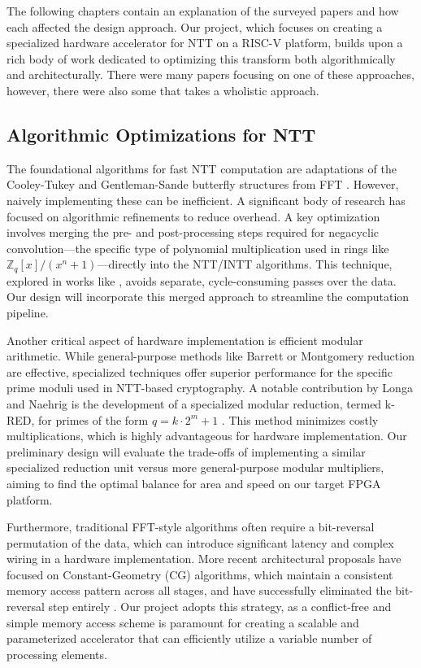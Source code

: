 \documentclass[a4paper, 12pt, titlepage]{article}
\begin{document}
The following chapters contain an explanation of the surveyed papers and how each affected the design approach. Our project, which focuses on creating a specialized hardware accelerator for NTT on a RISC-V platform, builds upon a rich body of work dedicated to optimizing this transform both algorithmically and architecturally. There were many papers focusing on one of these approaches, however, there were also some that takes a wholistic approach.

\subsection{Algorithmic Optimizations for NTT}
The foundational algorithms for fast NTT computation are adaptations of the Cooley-Tukey and Gentleman-Sande butterfly structures from FFT \cite{Satriawan2024Beginner}. However, naively implementing these can be inefficient. A significant body of research has focused on algorithmic refinements to reduce overhead. A key optimization involves merging the pre- and post-processing steps required for negacyclic convolution—the specific type of polynomial multiplication used in rings like $\mathbb{Z}_q[x]/(x^n+1)$—directly into the NTT/INTT algorithms. This technique, explored in works like \cite{Roy2014Compact, Liu2024Area}, avoids separate, cycle-consuming passes over the data. Our design will incorporate this merged approach to streamline the computation pipeline.

Another critical aspect of hardware implementation is efficient modular arithmetic. While general-purpose methods like Barrett or Montgomery reduction are effective, specialized techniques offer superior performance for the specific prime moduli used in NTT-based cryptography. A notable contribution by Longa and Naehrig is the development of a specialized modular reduction, termed k-RED, for primes of the form $q = k \cdot 2^m + 1$ \cite{Longa2016Speeding}. This method minimizes costly multiplications, which is highly advantageous for hardware implementation. Our preliminary design will evaluate the trade-offs of implementing a similar specialized reduction unit versus more general-purpose modular multipliers, aiming to find the optimal balance for area and speed on our target FPGA platform.

Furthermore, traditional FFT-style algorithms often require a bit-reversal permutation of the data, which can introduce significant latency and complex wiring in a hardware implementation. More recent architectural proposals have focused on Constant-Geometry (CG) algorithms, which maintain a consistent memory access pattern across all stages, and have successfully eliminated the bit-reversal step entirely \cite{Liu2024Area, Malal2023Designing}. Our project adopts this strategy, as a conflict-free and simple memory access scheme is paramount for creating a scalable and parameterized accelerator that can efficiently utilize a variable number of processing elements.
\end{document}

